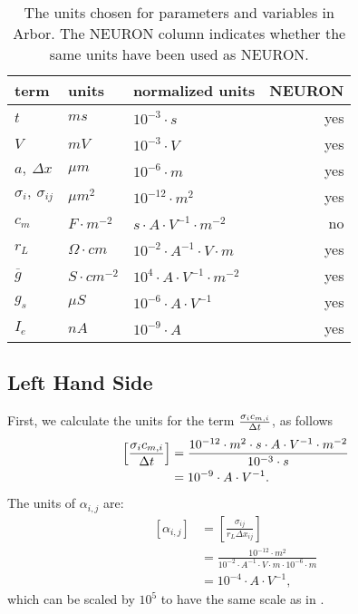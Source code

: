 \begin{table}[hp!]
\begin{tabular}{lllr}
    \hline
    term                      &   units                 &  normalized units                         & NEURON \\
    \hline
    $t$                       &   $ms$                  &  $10^{-3} \cdot s$                        & yes    \\
    $V$                       &   $mV$                  &  $10^{-3} \cdot V$                        & yes    \\
    $a,~\Delta x$             &   $\mu m$               &  $10^{-6} \cdot m$                        & yes    \\
    $\sigma_{i},~\sigma_{ij}$ &   $\mu m^2$             &  $10^{-12} \cdot m^2$                     & yes    \\
    $c_m$                     &   $F\cdot m^{-2}$       &  $s\cdot A\cdot V^{-1}\cdot m^{-2}$       & no     \\
    $r_L$                     &   $\Omega\cdot cm$      &  $10^{-2} \cdot A^{-1}\cdot V\cdot m$     & yes    \\
    $\overline{g}$            &   $S\cdot cm^{-2}$      &  $10^{4} \cdot A\cdot V^{-1}\cdot m^{-2}$ & yes    \\
    $g_s$                     &   $\mu S$               &  $10^{-6} \cdot A\cdot V^{-1}$            & yes    \\
    $I_e$                     &   $nA$                  &  $10^{-9} \cdot A$                        & yes    \\
    \hline
\end{tabular}
\caption{The units chosen for parameters and variables in Arbor. The NEURON column indicates whether the same units have been used as NEURON.}
\label{tbl:units}
\end{table}

\subsection{Left Hand Side}
First, we calculate the units for the term $\frac{\sigma_i c_{m,i}}{\Delta t}$, as follows
\begin{align}
    \left[ \frac{\sigma_i c_{m,i}}{\Delta t} \right]
        &=
    \frac{10^{-12}\cdot m^2 \cdot s\cdot A\cdot V^{-1}\cdot m^{-2} } {10^{-3}\cdot s}
            \nonumber \\
        &=
    10^{-9} \cdot A \cdot V^{-1}. \label{eq:units_lhs_diag}
\end{align}
The units of $\alpha_{i,j}$ are:
\begin{align}
    \left[ \alpha_{i,j} \right]
        &=
    \left[ \frac{\sigma_{ij}}{ r_L \Delta x_{ij}} \right] \nonumber \\
        &=
    \frac{10^{-12}\cdot m^2}{ 10^{-2} \cdot A^{-1}\cdot V\cdot m \cdot 10^{-6}\cdot m}
        \nonumber \\
        &=
    10^{-4}\cdot A \cdot V^{-1}, \label{eq:units_lhs_lu}
\end{align}
which can be scaled by $10^{5}$ to have the same scale as in .

